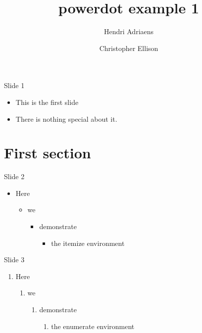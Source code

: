 \documentclass{powerdot}
\title{powerdot example 1}
\author{Hendri Adriaens \and Christopher Ellison}
\begin{document}
\maketitle

\begin{slide}{Slide 1}
  \begin{itemize}
    \item This is the first slide\pause
    \item There is nothing special about it.
  \end{itemize}
\end{slide}

\section{First section}

\begin{slide}{Slide 2}
  \begin{itemize}
    \item<1-> Here
    \begin{itemize}
      \item<2-> we
      \begin{itemize}
        \item<3-> demonstrate
        \begin{itemize}
          \item<4-> the itemize environment
        \end{itemize}
      \end{itemize}
    \end{itemize}
  \end{itemize}
\end{slide}

\begin{slide}{Slide 3}
  \begin{enumerate}[type=1]
    \item<1> Here
    \begin{enumerate}
      \item<2> we
      \begin{enumerate}
        \item<3> demonstrate
        \begin{enumerate}
          \item<4> the enumerate environment
        \end{enumerate}
      \end{enumerate}
    \end{enumerate}
  \end{enumerate}
\end{slide}
\end{document}
